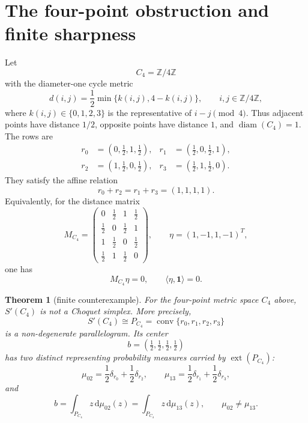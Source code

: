 \documentclass{proc-l}
\numberwithin{equation}{section}
\newtheorem{theorem}{Theorem}[section]
\theoremstyle{definition}
\theoremstyle{remark}
\newcommand{\one}{\mathbf 1}
\newcommand{\ext}{\operatorname{ext}}
\newcommand{\conv}{\operatorname{conv}}
\newcommand{\diam}{\operatorname{diam}}
\newcommand{\dd}{\mathrm d}
\begin{document}
\section{The four-point obstruction and finite sharpness}
\label{sec:c4}

Let
\[
        C_4=\mathbb Z/4\mathbb Z
\]
with the diameter-one cycle metric
\[
        d(i,j)=\frac12\min\{k(i,j),4-k(i,j)\},
        \qquad i,j\in\mathbb Z/4\mathbb Z,
\]
where \(k(i,j)\in\{0,1,2,3\}\) is the representative of \(i-j\pmod 4\).
Thus adjacent points have distance \(1/2\), opposite points have distance \(1\),
and \(\diam(C_4)=1\).  The rows are
\begin{align*}
        r_0&=(0,\tfrac12,1,\tfrac12),&
        r_1&=(\tfrac12,0,\tfrac12,1),\\
        r_2&=(1,\tfrac12,0,\tfrac12),&
        r_3&=(\tfrac12,1,\tfrac12,0).
\end{align*}
They satisfy the affine relation
\begin{equation}\label{eq:c4-relation}
        r_0+r_2=r_1+r_3=(1,1,1,1).
\end{equation}
Equivalently, for the distance matrix
\[
        M_{C_4}=\begin{pmatrix}
        0&\tfrac12&1&\tfrac12\\
        \tfrac12&0&\tfrac12&1\\
        1&\tfrac12&0&\tfrac12\\
        \tfrac12&1&\tfrac12&0
        \end{pmatrix},
        \qquad
        \eta=(1,-1,1,-1)^T,
\]
one has
\begin{equation}\label{eq:c4-kernel}
        M_{C_4}\eta=0,
        \qquad
        \langle\eta,\one\rangle=0.
\end{equation}

\begin{theorem}[finite counterexample]\label{thm:c4-counterexample}
For the four-point metric space \(C_4\) above, \(S'(C_4)\) is not a Choquet
simplex.  More precisely,
\[
        S'(C_4)\cong P_{C_4}=\conv\{r_0,r_1,r_2,r_3\}
\]
is a non-degenerate parallelogram.  Its center
\[
        b=(\tfrac12,\tfrac12,\tfrac12,\tfrac12)
\]
has two distinct representing probability measures carried by
\(\ext(P_{C_4})\):
\[
        \mu_{02}=\frac12\delta_{r_0}+\frac12\delta_{r_2},
        \qquad
        \mu_{13}=\frac12\delta_{r_1}+\frac12\delta_{r_3},
\]
and
\[
        b=\int_{P_{C_4}} z\,\dd\mu_{02}(z)
         =\int_{P_{C_4}} z\,\dd\mu_{13}(z),
        \qquad
        \mu_{02}\ne\mu_{13}.
\]
\end{theorem}
\end{document}
